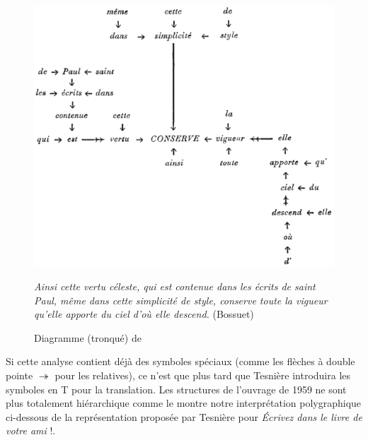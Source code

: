 {    \begin{figure}[H]
    \caption{Diagramme (tronqué) de \citet{tesniere1934comment}}
    \includegraphics[width=\textwidth]{figures/Tesniere1934.png}\smallskip\\    
    \noindent\parbox{\textwidth}{\small\textit{Ainsi cette vertu céleste, qui est contenue dans les écrits de saint Paul, même dans cette simplicité de style, conserve toute la vigueur qu’elle apporte du ciel d’où elle descend.} (Bossuet)}
    \end{figure}

    Si cette analyse contient déjà des symboles spéciaux (comme les flèches à double pointe \textrm{$\twoheadrightarrow $} pour les relatives), ce n’est que plus tard que Tesnière introduira les symboles en T pour la translation. Les structures de l’ouvrage de 1959 ne sont plus totalement hiérarchique comme le montre notre interprétation polygraphique ci-dessous de la représentation proposée par Tesnière pour \textit{Écrivez dans le livre de votre ami} !.

    \begin{figure}[H]
    \caption{Interprétation polygraphique d'un stemma}
    \begin{subfigure}[b]{.5\textwidth}\centering
\end{subfigure}
\end{figure}}
